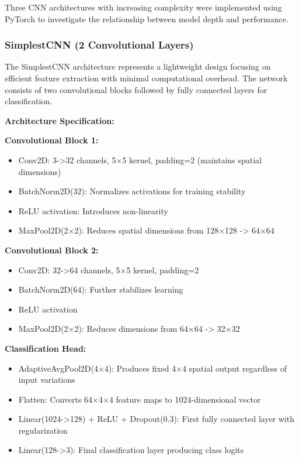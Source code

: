 \documentclass[12pt,a4paper]{article}
\begin{document}
Three CNN architectures with increasing complexity were implemented using PyTorch to investigate the relationship between model depth and performance.

\subsubsection{SimplestCNN (2 Convolutional Layers)}

The SimplestCNN architecture represents a lightweight design focusing on efficient feature extraction with minimal computational overhead. The network consists of two convolutional blocks followed by fully connected layers for classification.

\textbf{Architecture Specification:}

\textbf{Convolutional Block 1:}
\begin{itemize}
    \item Conv2D: 3->32 channels, 5×5 kernel, padding=2 (maintains spatial dimensions)
    \item BatchNorm2D(32): Normalizes activations for training stability
    \item ReLU activation: Introduces non-linearity
    \item MaxPool2D(2×2): Reduces spatial dimensions from 128×128 -> 64×64
\end{itemize}

\textbf{Convolutional Block 2:}
\begin{itemize}
    \item Conv2D: 32->64 channels, 5×5 kernel, padding=2
    \item BatchNorm2D(64): Further stabilizes learning
    \item ReLU activation
    \item MaxPool2D(2×2): Reduces dimensions from 64×64 -> 32×32
\end{itemize}

\textbf{Classification Head:}
\begin{itemize}
    \item AdaptiveAvgPool2D(4×4): Produces fixed 4×4 spatial output regardless of input variations
    \item Flatten: Converts 64×4×4 feature maps to 1024-dimensional vector
    \item Linear(1024->128) + ReLU + Dropout(0.3): First fully connected layer with regularization
    \item Linear(128->3): Final classification layer producing class logits
\end{itemize}
\end{document}
